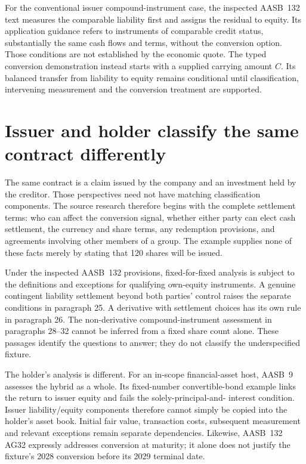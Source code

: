 For the conventional issuer compound-instrument case, the inspected
AASB~132 text measures the comparable liability first and assigns the residual
to equity. Its application guidance refers to instruments of comparable credit
status, substantially the same cash flows and terms, without the conversion
option\citep[paragraphs31--32 and AG31]{aasb132}. Those conditions are not
established by the economic quote. The typed conversion demonstration instead
starts with a supplied carrying amount $C$. Its balanced transfer from liability
to equity remains conditional until classification, intervening measurement
and the conversion treatment are supported.

\section{Issuer and holder classify the same contract differently}
\label{sim:conversion-authority-scope}
The same contract is a claim issued by the company and an investment held by
the creditor. Those perspectives need not have matching classification
components. The source research therefore begins with the complete settlement
terms: who can affect the conversion signal, whether either party can elect
cash settlement, the currency and share terms, any redemption provisions, and
agreements involving other members of a group. The example supplies none of
these facts merely by stating that 120 shares will be issued.

Under the inspected AASB~132 provisions, fixed-for-fixed analysis is subject
to the definitions and exceptions for qualifying own-equity instruments.
A genuine contingent liability settlement beyond both parties' control raises
the separate conditions in paragraph 25. A derivative with settlement choices
has its own rule in paragraph 26. The non-derivative compound-instrument
assessment in paragraphs 28--32 cannot be inferred from a fixed share count
alone\citep[paragraphs15--16,22--26 and28--32]{aasb132}. These passages identify
the questions to answer; they do not classify the underspecified fixture.

The holder's analysis is different. For an in-scope financial-asset host,
AASB~9 assesses the hybrid as a whole. Its fixed-number convertible-bond
example links the return to issuer equity and fails the solely-principal-and-
interest condition\citep[paragraphs4.3.2 and B4.1.14, Instrument F]{aasb9scope2026}.
Issuer liability/equity components therefore cannot simply be copied into the
holder's asset book. Initial fair value, transaction costs, subsequent
measurement and relevant exceptions remain separate dependencies. Likewise,
AASB~132 AG32 expressly addresses conversion at maturity; it alone does not
justify the fixture's 2028 conversion before its 2029 terminal date.

